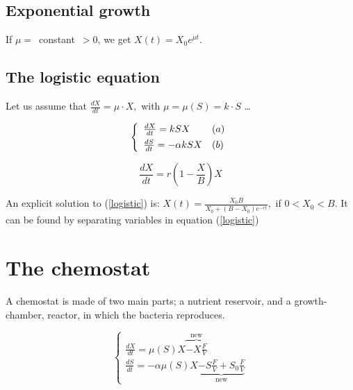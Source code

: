 \documentclass[a4paper, 10pt, twoside, openright]{book}
\begin{document}
\subsection{Exponential growth}

If \mbox{$\mu =$ constant $>0$,} we get $X(t)={X}_0
{e}^{\mu t}$.

\subsection{The logistic equation}

Let us assume that $\frac{dX}{dt}=\mu \cdot X,$ with
$\mu=\mu(S)=k\cdot S$ \ldots 

\begin{displaymath}
\left\{ \begin{array}{ll}
\frac{dX}{dt}=kSX                            & (a) \\
\frac{dS}{dt}=- \alpha kSX \rule{0pt}{3ex}   & (b) 
\end{array}\right.
\end{displaymath}

\begin{equation} \label{logistic}
\frac{dX}{dt}= r(1- \frac{X}{B})X  
\end{equation}

An explicit solution to (\ref{logistic}) is: 
$X(t)=\frac{{X}_{0}B}{{X}_{0}+(B-{X}_{0}){e}^{-rt}},$ if $0<{X}_{0}<B$. 
It can be found by separating variables in equation (\ref{logistic})


\section{The chemostat} 

A chemostat is made of two main parts; a nutrient reservoir, and a
growth-chamber, reactor, in which the bacteria reproduces. 

\begin{equation} \label{chemo_basic}
\left\{ \begin{array}{l}
\frac{dX}{dt}= \mu(S)X \overbrace{-X\frac{F}{V}}^{\textrm{new}}  \\
\frac{dS}{dt}=- \alpha \mu(S) X
\underbrace{-S\frac{F}{V}+ {S}_{0}\frac{F}{V}}_{\textrm{new}} 
\end{array}\right.
\end{equation}
\end{document}
